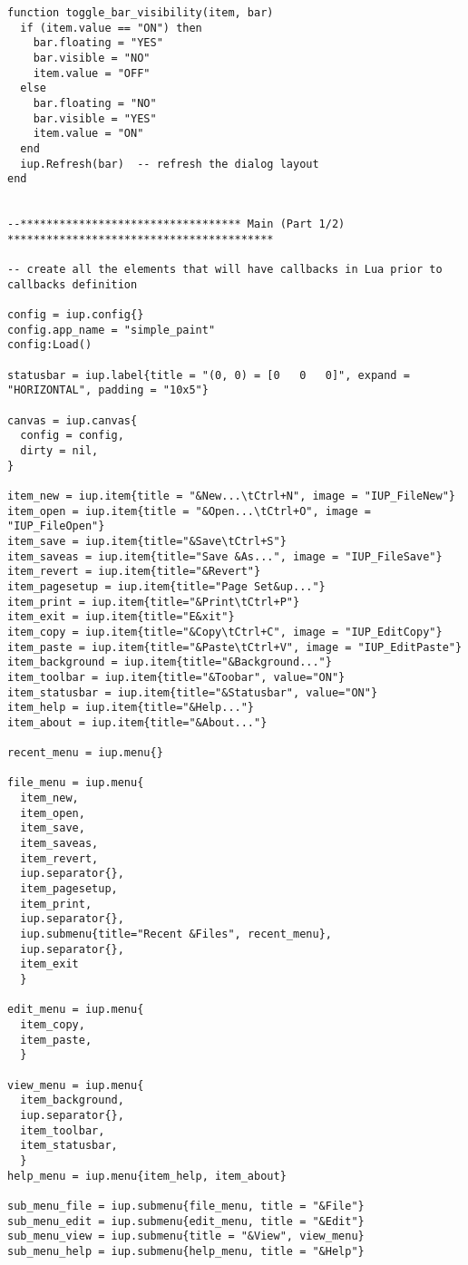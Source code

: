 \documentclass{ctexart}
\begin{document}
\begin{lstlisting}
function toggle_bar_visibility(item, bar)
  if (item.value == "ON") then
    bar.floating = "YES"
    bar.visible = "NO"
    item.value = "OFF"
  else
    bar.floating = "NO"
    bar.visible = "YES"
    item.value = "ON"
  end
  iup.Refresh(bar)  -- refresh the dialog layout
end


--********************************** Main (Part 1/2) *****************************************

-- create all the elements that will have callbacks in Lua prior to callbacks definition

config = iup.config{}
config.app_name = "simple_paint"
config:Load()

statusbar = iup.label{title = "(0, 0) = [0   0   0]", expand = "HORIZONTAL", padding = "10x5"}

canvas = iup.canvas{
  config = config,
  dirty = nil,
}

item_new = iup.item{title = "&New...\tCtrl+N", image = "IUP_FileNew"}
item_open = iup.item{title = "&Open...\tCtrl+O", image = "IUP_FileOpen"}
item_save = iup.item{title="&Save\tCtrl+S"}
item_saveas = iup.item{title="Save &As...", image = "IUP_FileSave"}
item_revert = iup.item{title="&Revert"}
item_pagesetup = iup.item{title="Page Set&up..."}
item_print = iup.item{title="&Print\tCtrl+P"}
item_exit = iup.item{title="E&xit"}
item_copy = iup.item{title="&Copy\tCtrl+C", image = "IUP_EditCopy"}
item_paste = iup.item{title="&Paste\tCtrl+V", image = "IUP_EditPaste"}
item_background = iup.item{title="&Background..."}
item_toolbar = iup.item{title="&Toobar", value="ON"}
item_statusbar = iup.item{title="&Statusbar", value="ON"}
item_help = iup.item{title="&Help..."}
item_about = iup.item{title="&About..."}

recent_menu = iup.menu{}

file_menu = iup.menu{
  item_new,
  item_open,
  item_save,
  item_saveas,
  item_revert,
  iup.separator{},
  item_pagesetup,
  item_print,
  iup.separator{},
  iup.submenu{title="Recent &Files", recent_menu},
  iup.separator{},
  item_exit
  }

edit_menu = iup.menu{
  item_copy,
  item_paste,
  }

view_menu = iup.menu{
  item_background,
  iup.separator{},
  item_toolbar, 
  item_statusbar, 
  }
help_menu = iup.menu{item_help, item_about}

sub_menu_file = iup.submenu{file_menu, title = "&File"}
sub_menu_edit = iup.submenu{edit_menu, title = "&Edit"}
sub_menu_view = iup.submenu{title = "&View", view_menu}
sub_menu_help = iup.submenu{help_menu, title = "&Help"}


\end{lstlisting}
\end{document}
